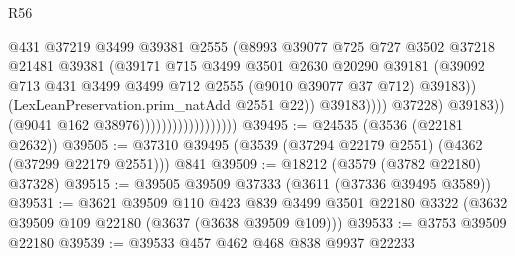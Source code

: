 \begin{lexlean}{R56}
\begin{coremodule}
                                                    @431
                                                    @37219
                                                    @3499
                                                    @39381
                                                    @2555
                                                    (@8993
                                                      @39077
                                                      @725
                                                      @727
                                                      @3502
                                                      @37218
                                                      @21481
                                                      @39381
                                                      (@39171
                                                        @715
                                                        @3499
                                                        @3501
                                                        @2630
                                                        @20290
                                                        @39181
                                                        (@39092
                                                          @713
                                                          @431
                                                          @3499
                                                          @3499
                                                          @712
                                                          @2555
                                                          (@9010 @39077 @37 @712)
                                                          @39183))
                                                      (LexLeanPreservation.prim_natAdd @2551 @22))
                                                    @39183))))
                                            @37228)
                                          @39183))
                                      (@9041 @162 @38976))))))))))))))))))
@39495 := @24535 (@3536 (@22181 @2632))
@39505 := @37310 @39495 (@3539 (@37294 @22179 @2551) (@4362 (@37299 @22179 @2551))) @841
@39509 := @18212 (@3579 (@3782 @22180) @37328)
@39515 := @39505 @39509 @37333 (@3611 (@37336 @39495 @3589))
@39531 := @3621
    @39509
    @110
    @423
    @839
    @3499
    @3501
    @22180
    @3322
    (@3632 @39509 @109 @22180 (@3637 (@3638 @39509 @109)))
@39533 := @3753 @39509 @22180
@39539 := @39533 @457 @462 @468 @838 @9937 @22233

\end{coremodule}
\end{lexlean}
